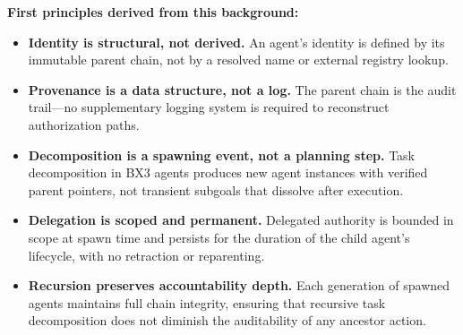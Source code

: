 \bigskip

\noindent\textbf{First principles derived from this background:}

\begin{itemize}
    \item \textbf{Identity is structural, not derived.} An agent's identity is defined by its immutable parent chain, not by a resolved name or external registry lookup.
    \item \textbf{Provenance is a data structure, not a log.} The parent chain is the audit trail---no supplementary logging system is required to reconstruct authorization paths.
    \item \textbf{Decomposition is a spawning event, not a planning step.} Task decomposition in BX3 agents produces new agent instances with verified parent pointers, not transient subgoals that dissolve after execution.
    \item \textbf{Delegation is scoped and permanent.} Delegated authority is bounded in scope at spawn time and persists for the duration of the child agent's lifecycle, with no retraction or reparenting.
    \item \textbf{Recursion preserves accountability depth.} Each generation of spawned agents maintains full chain integrity, ensuring that recursive task decomposition does not diminish the auditability of any ancestor action.
\end{itemize}


